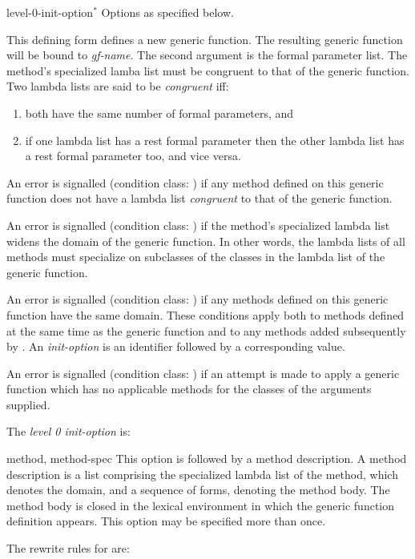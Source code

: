 \begin{optDefinition}
\begin{arguments}
    \item[level-0-init-option\/$^*$\/] Options as specified below.
\end{arguments}
%
\remarks%
This defining form defines a new generic function.  The resulting
generic function will be bound to {\em gf-name}.  The second argument
is the formal parameter list.  The method's specialized lamba list
must be congruent to that of the generic function.  Two lambda lists
are said to be {\em congruent\/} iff:
%
\begin{enumerate}
    \item  both have the same number of formal parameters, and
    \item  if one lambda list has a rest formal parameter then the other
    lambda list has a rest formal parameter too, and vice versa.
\end{enumerate}
%
An error is signalled (condition class:
) if any method defined on this
generic function does not have a lambda list {\em congruent\/} to that of the
generic function.

An error is signalled (condition class:
) if the method's specialized lambda
list widens the domain of the generic function.  In other words, the lambda
lists of all methods must specialize on subclasses of the classes in the lambda
list of the generic function.

An error is signalled (condition class:
) if any
methods defined on this generic function have the same domain.  These conditions
apply both to methods defined at the same time as the generic function and to
any methods added subsequently by .  An {\em init-option\/}
is an identifier followed by a corresponding value.

An error is signalled (condition class:
) if an
attempt is made to apply a generic function which has no applicable methods for
the classes of the arguments supplied.

The {\em level 0 init-option\/} is:
\begin{options}
    \item[method, method-spec] This option is followed by a method description.
    A method description is a list comprising the specialized lambda list of the
    method, which denotes the domain, and a sequence of forms, denoting the
    method body.  The method body is closed in the lexical environment in which
    the generic function definition appears. This option may be specified more
    than once.
\end{options}
%
The rewrite rules for  are:


\end{optDefinition}
